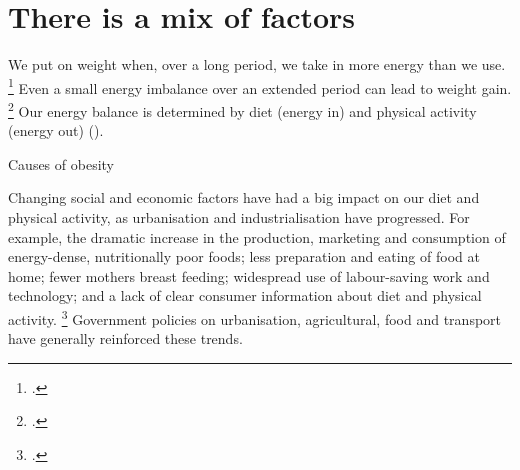 \documentclass[embargoed]{grattan}
\begin{document}
\section{There is a mix of factors}\label{there-is-a-mix-of-factors}

We put on weight when, over a long period, we take in more energy than we use.%
\footcites{Organization2016ObesityoverweightFact}{Organisation2000Obesitypreventingmanaging}{Ebbeling2002Childhoodobesitypublic}{Swinburn2004Dietnutritionprevention}{Cutler2003WhyhaveAmericans}{Roberto2015Patchyprogressobesity} Even a small energy imbalance over an extended period can lead to weight gain.%
\footcites{Ebbeling2002Childhoodobesitypublic}{Cutler2003WhyhaveAmericans} Our energy balance is determined by diet (energy in) and physical activity (energy out) ().

\begin{table}
\caption{Causes of obesity} \label{tbl:causes-of-obesity}




\end{table}

Changing social and economic factors have had a big impact on our diet and physical activity, as urbanisation and industrialisation have progressed.
For example, the dramatic increase in the production, marketing and consumption of energy-dense, nutritionally poor foods; less preparation and eating of food at home; fewer mothers breast feeding; widespread use of labour-saving work and technology; and a lack of clear consumer information about diet and physical activity.%
\footcites{Livingston2012JAMAobesitytheme}{Ewart-Pierce2016WholeCommunityObesity}{Roberto2015Patchyprogressobesity}{Keith2006Putativecontributorssecular}{Wright2012Causesobesity}{Lakdawalla2009growthobesitytechnological}{Popkin2004nutritiontransitionworldwide}{Popkin2001nutritiontransitionobesity}{Karnani2016ObesityCrisisas}{Bray2004Consumptionhighfructose}{Organisation2000Obesitypreventingmanaging}{Swinburn2004Dietnutritionprevention} Government policies on urbanisation, agricultural, food and transport have generally reinforced these trends.
\end{document}
